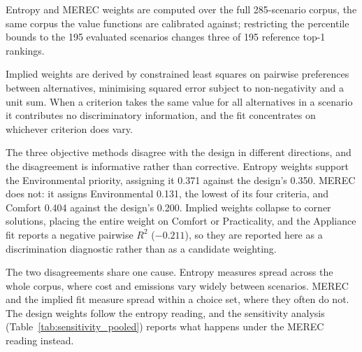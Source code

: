 Entropy and MEREC weights are computed over the full 285-scenario corpus, the
same corpus the value functions are calibrated against; restricting the
percentile bounds to the 195 evaluated scenarios changes three of 195 reference
top-1 rankings.

Implied weights are derived by constrained least squares on pairwise
preferences between alternatives, minimising squared error subject to
non-negativity and a unit sum. When a criterion takes the same value for all
alternatives in a scenario it contributes no discriminatory information, and
the fit concentrates on whichever criterion does vary.

The three objective methods disagree with the design in different directions,
and the disagreement is informative rather than corrective. Entropy weights
support the Environmental priority, assigning it 0.371 against the design's
0.350. MEREC does not: it assigns Environmental 0.131, the lowest of its four
criteria, and Comfort 0.404 against the design's 0.200. Implied weights
collapse to corner solutions, placing the entire weight on Comfort or
Practicality, and the Appliance fit reports a negative pairwise $R^2$
($-0.211$), so they are reported here as a discrimination diagnostic rather
than as a candidate weighting.

The two disagreements share one cause. Entropy measures spread across the whole
corpus, where cost and emissions vary widely between scenarios. MEREC and the
implied fit measure spread within a choice set, where they often do not. The
design weights follow the entropy reading, and the sensitivity analysis
(Table~\ref{tab:sensitivity_pooled}) reports what happens under the MEREC
reading instead.
